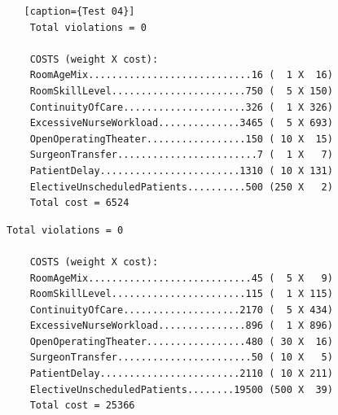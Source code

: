 \begin{lstlisting}   [caption={Test 04}]
    Total violations = 0
    
    COSTS (weight X cost): 
    RoomAgeMix............................16 (  1 X  16)
    RoomSkillLevel.......................750 (  5 X 150)
    ContinuityOfCare.....................326 (  1 X 326)
    ExcessiveNurseWorkload..............3465 (  5 X 693)
    OpenOperatingTheater.................150 ( 10 X  15)
    SurgeonTransfer........................7 (  1 X   7)
    PatientDelay........................1310 ( 10 X 131)
    ElectiveUnscheduledPatients..........500 (250 X   2)
    Total cost = 6524
\end{lstlisting}

\begin{lstlisting}[caption={Test 06}]
    Total violations = 0

    COSTS (weight X cost): 
    RoomAgeMix............................45 (  5 X   9)
    RoomSkillLevel.......................115 (  1 X 115)
    ContinuityOfCare....................2170 (  5 X 434)
    ExcessiveNurseWorkload...............896 (  1 X 896)
    OpenOperatingTheater.................480 ( 30 X  16)
    SurgeonTransfer.......................50 ( 10 X   5)
    PatientDelay........................2110 ( 10 X 211)
    ElectiveUnscheduledPatients........19500 (500 X  39)
    Total cost = 25366
\end{lstlisting}
\newpage
